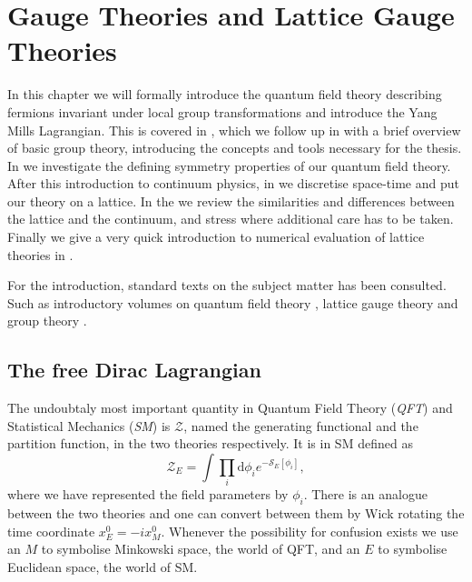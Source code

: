 \chapter{Gauge Theories and Lattice Gauge Theories} \label{chap2}

In this chapter we will formally introduce the quantum field theory describing
fermions invariant under local group transformations and introduce the Yang
Mills Lagrangian. This is covered in , which we
follow up in  with a brief overview of basic group
theory, introducing the concepts and tools necessary for the thesis. In
 we investigate the defining symmetry properties of our
quantum field theory. After this introduction to continuum physics, in
 we discretise space-time and put our theory on a
lattice. In the  we review the
similarities and differences between the lattice and the continuum, and stress
where additional care has to be taken. Finally we give a very quick introduction
to numerical evaluation of lattice theories in .

For the introduction, standard texts on the subject matter has been consulted.
Such as introductory volumes on quantum field theory
\citep[e.g.][]{peskin1995introduction,maggiore2004modern}, lattice gauge theory
\citep[e.g.][]{montvay1997quantum,gattringer2009quantum} and group theory
\citep[e.g.][]{georgi1999lie,fulton2013representation}.

\section{The free Dirac Lagrangian} \label{sec:continuum_gauge}

The undoubtaly most important quantity in Quantum Field Theory (\emph{QFT}) and
Statistical Mechanics (\emph{SM}) is $\mathcal{Z}$, named the generating
functional and the partition function, in the two theories respectively. It is
in SM defined as
%
\begin{equation} \label{eq:partition}
  \mathcal{Z}_E = \int \prod_i \mathrm{d} \phi_i e^{-\mathcal{S}_E[\phi_i]},
\end{equation}
%
where we have represented the field parameters by $\phi_i$. There is an analogue
between the two theories and one can convert between them by Wick rotating the
time coordinate $x^0_E = -i x^0_M$. Whenever the possibility for confusion
exists we use an $M$ to symbolise Minkowski space, the world of QFT, and an $E$
to symbolise Euclidean space, the world of SM.

